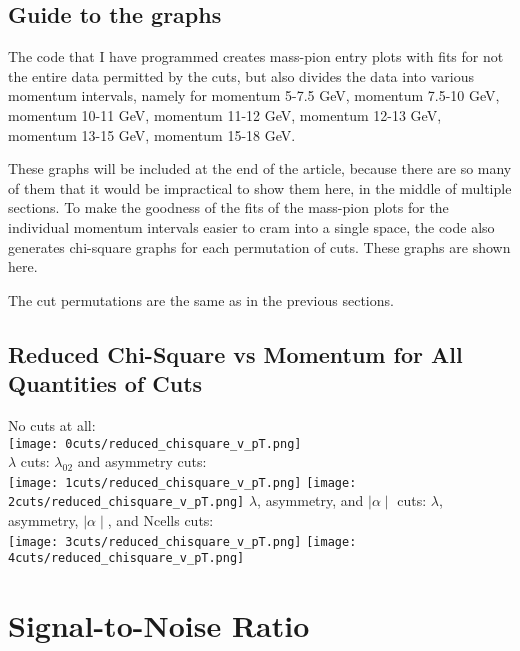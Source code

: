 \documentclass[11pt]{article}
\begin{document}
\subsection{Guide to the graphs} %
The code that I have programmed creates mass-pion entry plots with fits for not the entire data permitted by the cuts, but also divides the data into various momentum intervals, namely for momentum 5-7.5 GeV, momentum 7.5-10 GeV, momentum 10-11 GeV, momentum 11-12 GeV, momentum 12-13 GeV, momentum 13-15 GeV, momentum 15-18 GeV.

These graphs will be included at the end of the article, because there are so many of them that it would be impractical  to show them here, in the middle of multiple sections. To make the goodness of the fits of the mass-pion plots for the individual momentum intervals easier to cram into a single space, the code also generates chi-square graphs for each permutation of cuts. These graphs are shown here.

The cut permutations are the same as in the previous sections.

\subsection{Reduced Chi-Square vs Momentum for  All Quantities of Cuts} %
\begin{frame}{}
No cuts at all:\\
\texttt{[image: 0cuts/reduced\_chisquare\_v\_pT.png]}\\
$\lambda$ cuts: 
\noindent\hspace{3 cm} $\lambda_{02}$ and asymmetry cuts: \\
\texttt{[image: 1cuts/reduced\_chisquare\_v\_pT.png]}
\texttt{[image: 2cuts/reduced\_chisquare\_v\_pT.png]}
$\lambda$, asymmetry, and $\mid\alpha\mid$ cuts:
\noindent\hspace{4 cm} $\lambda$, asymmetry, $\mid\alpha\mid$, and Ncells cuts:\\
\texttt{[image: 3cuts/reduced\_chisquare\_v\_pT.png]}
\texttt{[image: 4cuts/reduced\_chisquare\_v\_pT.png]}
\end{frame}

\section{Signal-to-Noise Ratio}
\end{document}

